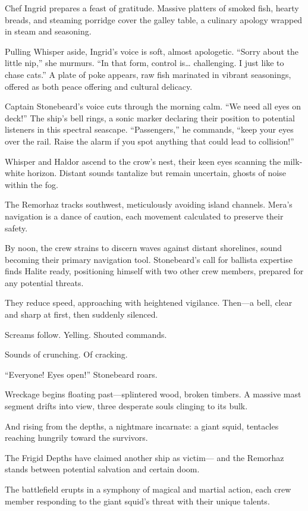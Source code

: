 \documentclass[
  letterpaper,12pt,twoside,twocolumn,openany,
  nodeprecatedcode,bg=full]{dndbook}
\begin{document}
Chef Ingrid prepares a feast of gratitude. Massive platters of smoked
fish, hearty breads, and steaming porridge cover the galley table, a
culinary apology wrapped in steam and seasoning.

Pulling Whisper aside, Ingrid's voice is soft, almost apologetic.
``Sorry about the little nip,'' she murmurs. ``In that form, control
is\ldots{} challenging. I just like to chase cats.'' A plate of poke
appears, raw fish marinated in vibrant seasonings, offered as both peace
offering and cultural delicacy.

Captain Stonebeard's voice cuts through the morning calm. ``We need all
eyes on deck!'' The ship's bell rings, a sonic marker declaring their
position to potential listeners in this spectral seascape.
``Passengers,'' he commands, ``keep your eyes over the rail. Raise the
alarm if you spot anything that could lead to collision!''

Whisper and Haldor ascend to the crow's nest, their keen eyes scanning
the milk-white horizon. Distant sounds tantalize but remain uncertain,
ghosts of noise within the fog.

The Remorhaz tracks southwest, meticulously avoiding island channels.
Mera's navigation is a dance of caution, each movement calculated to
preserve their safety.

By noon, the crew strains to discern waves against distant shorelines,
sound becoming their primary navigation tool. Stonebeard's call for
ballista expertise finds Halite ready, positioning himself with two
other crew members, prepared for any potential threats.

They reduce speed, approaching with heightened vigilance. Then---a bell,
clear and sharp at first, then suddenly silenced.

Screams follow. Yelling. Shouted commands.

Sounds of crunching. Of cracking.

``Everyone! Eyes open!'' Stonebeard roars.

Wreckage begins floating past---splintered wood, broken timbers. A
massive mast segment drifts into view, three desperate souls clinging to
its bulk.

And rising from the depths, a nightmare incarnate: a giant squid,
tentacles reaching hungrily toward the survivors.

The Frigid Depths have claimed another ship as victim--- and the
Remorhaz stands between potential salvation and certain doom.

The battlefield erupts in a symphony of magical and martial action, each
crew member responding to the giant squid's threat with their unique
talents.
\end{document}
